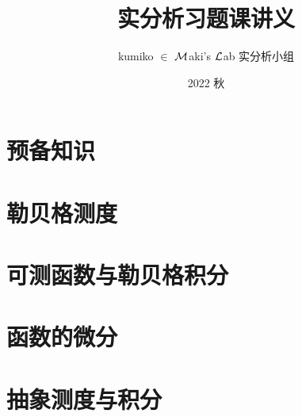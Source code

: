 \documentclass[lang=cn, color=none]{elegantbook}
\title{实分析习题课讲义}
\subtitle{}
\author{kumiko $\in$ $\calM$aki's $\calL$ab 实分析小组}
\institute{$\calM$aki's $\calL$ab}
\date{2022 秋}
\begin{document}

\maketitle
\frontmatter

\tableofcontents

\mainmatter
\chapter{预备知识}
    
    
    
\chapter{勒贝格测度}
    
    
    
    
\chapter{可测函数与勒贝格积分}
    

    
    
    
    
    

    

\chapter{函数的微分}
    
    

\chapter{抽象测度与积分}
    
    

\end{document}
